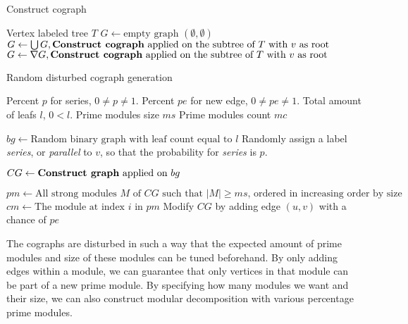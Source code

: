 \documentclass[a4paper]{article}
\begin{document}
\begin{algorithm}[H]
    \caption{Construct cograph}
   \begin{algorithmic}[1]
        \REQUIRE Vertex labeled tree $T$
        \ENDIF
        \STATE $G \leftarrow \text{empty graph $(\emptyset,\emptyset)$}$
                \STATE $G \leftarrow \bigcup G, \text{\textbf{Construct cograph} applied
                on the subtree of $T$ with $v$ as root} $
                \STATE $G \leftarrow \nabla G, \text{\textbf{Construct cograph} applied
                on the subtree of $T$ with $v$ as root}$
            \ENDIF
        \ENDFOR
    \end{algorithmic}
\end{algorithm}

\begin{algorithm}[H]
    \caption{Random disturbed cograph generation}
  \label{alg:RDCG}
  \begin{algorithmic}[1]
      \REQUIRE Percent $p$ for series, $0 \neq p \neq 1$.
      \REQUIRE Percent $pe$ for new  edge, $0 \neq pe \neq 1$.
      \REQUIRE Total amount of leafs $l$, $0 < l$.
      \REQUIRE Prime modules size $ms$
      \REQUIRE Prime modules count $mc$

      \STATE $bg \leftarrow \text{Random binary graph with leaf count equal to $l$}$
        \STATE Randomly assign a label  \textit{series}, or \textit{parallel} to $v$, so
        that the probability for \textit{series} is $p$.
      \ENDFOR

      \STATE $CG \leftarrow \text{\textbf{Construct graph} applied on $bg$}$

      \STATE $pm \leftarrow \text{All strong modules $M$ of $CG$ such that $|M| \geq ms$, ordered in increasing order by size}$
        \STATE $cm \leftarrow \text{The module at index $i$ in $pm$}$
            \STATE Modify $CG$ by adding edge $(u,v)$ with a chance of $pe$
        \ENDFOR
      \ENDFOR
  \end{algorithmic}
\end{algorithm}

The cographs are disturbed in such a way that the expected amount of prime
modules and size of these modules can be tuned beforehand. By only adding edges
within a module, we can guarantee that only vertices in that module can be part
of a new prime module. By specifying how many modules we want and their size, we
can also construct modular decomposition with various percentage prime modules.
\end{document}
